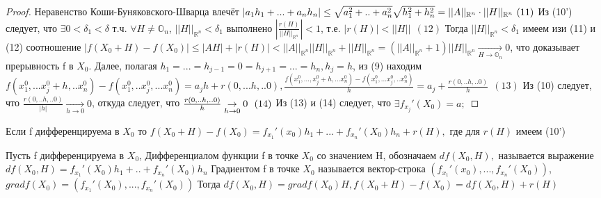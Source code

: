 \begin{proof}
	Неравенство Коши-Буняковского-Шварца влечёт $|a_1h_1+...+a_nh_n| \leq \sqrt{a_1^2+..+a_n^2}\sqrt{h_1^2+h_n^2} = ||A||_{\mathbb{R}^n} \cdot ||H||_{\mathbb{R}^n} \ (11) \\$
	Из (10') следует, что $\exists 0 < \delta_1 < \delta$ т.ч. $\forall H \neq \mathbb{O}_n$, $||H||_{\mathbb{R}^{n}} < \delta_1$ выполнено $|\frac{r(H)}{||H||_{\mathbb{R}^n}}| < 1$, т.е. $|r(H)| < ||H|| \ \ (12)$ Тогда $||H||_{\mathbb{R}^n} < \delta_1$ имеем изи (11) и (12) соотношение $|f(X_0+H)-f(X_0)|\leq |AH|+|r(H)| < ||A||_{\mathbb{R}^n}||H||_{\mathbb{R}^n} + ||H||_{\mathbb{R}^n} = (||A||_{\mathbb{R}^n} + 1)||H||_{\mathbb{R}^n} \underset{H \to \mathbb{O}_n}{\to} 0$, что доказывает прерывность f в $X_0$. Далее, полагая $h_1 = ... = h_{j-1} = 0 = h_{j+1} = ... =h_n, h_j = h$, из (9) находим  $f(x_1^0,...x_j^0+h,..x_n^0) -f(x_1^0,..x_j^0,...x_n^0) = a_jh + r(0,...h,..0), \frac{f(x_1^0,...,x_j^0+h,...x_n^0)-f(x_1^0,...x_j^0,..x_n^0)}{h}= a_j + \frac{r(0,..h,..0)}{h} \ \ (13)$ Из (10) следует, что $\frac{r(0,..h,..0)}{|h|} \underset{h \to 0}{\to} 0$, откуда следует, что $\frac{r(0,..h,..0)}{h} \underset{h \to 0}{\to} 0 \ \ (14) \\$
	Из (13) и (14) следует, что $\exists f_{x_j}'(X_0) = a;$
\end{proof}
Если f дифференцируема в $X_0$ то $f(X_0 + H) -f(X_0)=f_{x_1}'(x_0)h_1 + ...+f_{x_n}'(X_0)h_n+r(H),$ где для $r(H)$ имеем (10')
\begin{definition}
	Пусть f дифференцируема в $X_0$, Дифференциалом функции f в точке $X_0$ со значением H, обозначаем $df(X_0,H),$ называется выражение $df(X_0,H) = f_{x_1}'(X_0)h_1 + .. + f_{x_n}'(X_0)h_n$ Градиентом f в точке $X_0$ называется вектор-строка $(f_{x_1}'(x_0),...,f_{x_n}'(X_0))$, $grad f(X_0) = (f_{x_1}'(X_0),...,f_{x_n}'(X_0))$ Тогда $df(X_0,H) = grad f(X_0)H, f(X_0 + H) - f(X_0) = df(X_0,H) + r(H)$
\end{definition}

